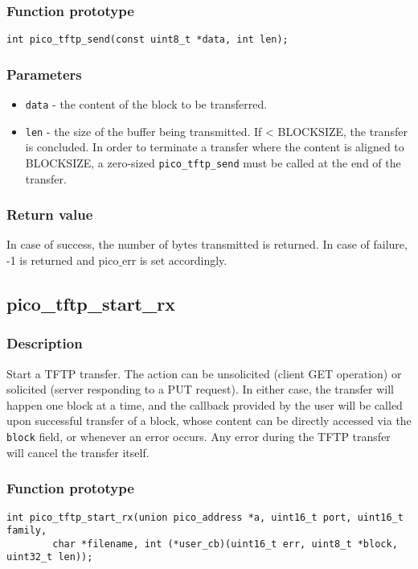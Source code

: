\subsubsection*{Function prototype}
\begin{verbatim}
int pico_tftp_send(const uint8_t *data, int len);
\end{verbatim}


\subsubsection*{Parameters}
\begin{itemize}[noitemsep]
\item \texttt{data} - the content of the block to be transferred.
\item \texttt{len} - the size of the buffer being transmitted. If < BLOCKSIZE, the transfer is concluded. In order to terminate a transfer where the content is aligned to BLOCKSIZE, a zero-sized \texttt{pico\_tftp\_send} must be called at the end of the transfer.
\end{itemize}

\subsubsection*{Return value}
In case of success, the number of bytes transmitted is returned. In case of failure, -1 is returned and pico$\_$err is set accordingly.


\subsection{pico\_tftp\_start\_rx}

\subsubsection*{Description}
Start a TFTP transfer. The action can be unsolicited (client GET operation) or solicited (server responding to a PUT request).
In either case, the transfer will happen one block at a time, and the callback provided by the user will be called upon successful
transfer of a block, whose content can be directly accessed via the \texttt{block} field,  or whenever an error occurs. Any error during the TFTP transfer will cancel the transfer itself.

\subsubsection*{Function prototype}
\begin{verbatim}
int pico_tftp_start_rx(union pico_address *a, uint16_t port, uint16_t family,
        char *filename, int (*user_cb)(uint16_t err, uint8_t *block, uint32_t len));
\end{verbatim}

